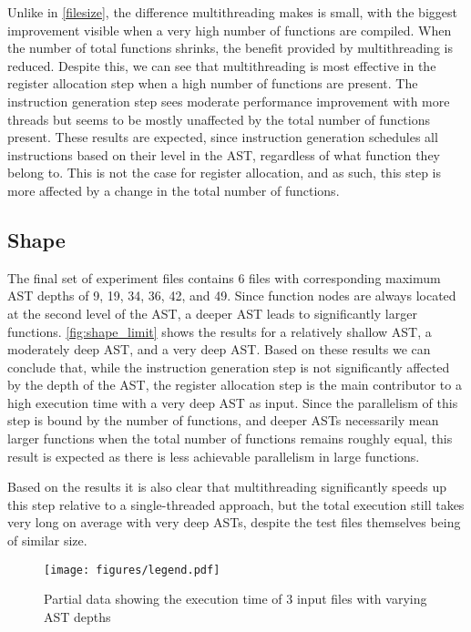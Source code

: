 \documentclass[11pt,dvipsnames]{article}
\begin{document}
Unlike in \autoref{filesize}, the difference multithreading makes is small, with the biggest improvement visible when a very high number of functions are compiled. When the number of total functions shrinks, the benefit provided by multithreading is reduced. Despite this, we can see that multithreading is most effective in the register allocation step when a high number of functions are present. The instruction generation step sees moderate performance improvement with more threads but seems to be mostly unaffected by the total number of functions present. These results are expected, since instruction generation schedules all instructions based on their level in the AST, regardless of what function they belong to. This is not the case for register allocation, and as such, this step is more affected by a change in the total number of functions.

\subsection{Shape} \label{shape}
The final set of experiment files contains 6 files with corresponding maximum AST depths of 9, 19, 34, 36, 42, and 49. Since function nodes are always located at the second level of the AST, a deeper AST leads to significantly larger functions. \autoref{fig:shape_limit} shows the results for a relatively shallow AST, a moderately deep AST, and a very deep AST. Based on these results we can conclude that, while the instruction generation step is not significantly affected by the depth of the AST, the register allocation step is the main contributor to a high execution time with a very deep AST as input. Since the parallelism of this step is bound by the number of functions, and deeper ASTs necessarily mean larger functions when the total number of functions remains roughly equal, this result is expected as there is less achievable parallelism in large functions.

Based on the results it is also clear that multithreading significantly speeds up this step relative to a single-threaded approach, but the total execution still takes very long on average with very deep ASTs, despite the test files themselves being of similar size.

\begin{figure}[!ht]
    \centering
    \texttt{[image: figures/legend.pdf]}
    \caption{Partial data showing the execution time of 3 input files with varying AST depths}
    \label{fig:shape_limit}
\end{figure}
\end{document}
